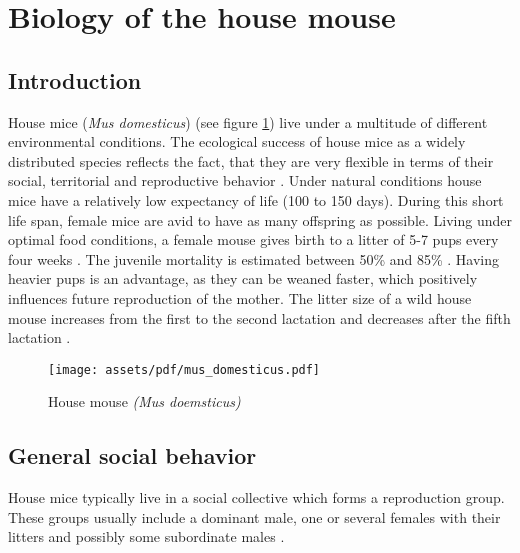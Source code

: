 \newpage
\section{Biology of the house mouse}
\label{sec:biolhousemice}

\subsection{Introduction}
\label{subsec:introduction}

House mice (\textit{Mus domesticus}) (see figure \ref{fig:housemice}) live under a multitude of different environmental conditions. The ecological success of house mice as a widely distributed species reflects the fact, that they are very flexible in terms of their social, territorial and reproductive behavior \citep{bronson:79, bronson:84, berry:81}. Under natural conditions house mice have a relatively low expectancy of life (100 to 150 days). During this short life span, female mice are avid to have as many offspring as possible. Living under optimal food conditions, a female mouse gives birth to a litter of 5-7 pups every four weeks \citep{berry:71, pelikan:81}. The juvenile mortality is estimated between 50\% and 85\% \citep{berry:71, berry:75, pennycuik:86}. Having heavier pups is an advantage, as they can be weaned faster, which positively influences future reproduction of the mother\citep{fuchs:82}. The litter size of a wild house mouse increases from the first to the second lactation and decreases after the fifth lactation \citep{pelikan:81, koenig:87b}. 

\begin{figure}[htbp]	
\centering	
\texttt{[image: assets/pdf/mus\_domesticus.pdf]}	
\caption[House mouse]{House mouse \textit{(Mus doemsticus)}}
\label{fig:housemice}
\end{figure}

\subsection{General social behavior}
\label{subsec:socialbehaviour}
House mice typically live in a social collective which forms a reproduction group. These groups usually include a dominant male, one or several females with their litters and possibly some subordinate males \citep{crowcroft:63, reimer:67, selander:70, mackintosh:81}.


